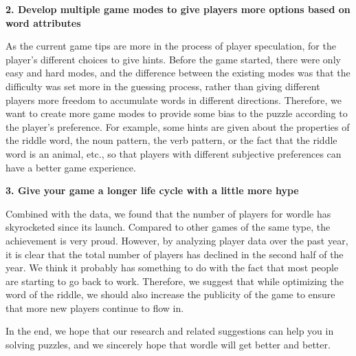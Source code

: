 \documentclass{mcmthesis}
\begin{document}
\begin{memo}[Memorandum]
 \textbf{2. Develop multiple game modes to give players more options based on word attributes}
 
 As the current game tips are more in the process of player speculation, for the player's different choices to give hints. Before the game started, there were only easy and hard modes, and the difference between the existing modes was that the difficulty was set more in the guessing process, rather than giving different players more freedom to accumulate words in different directions. Therefore, we want to create more game modes to provide some bias to the puzzle according to the player's preference. For example, some hints are given about the properties of the riddle word, the noun pattern, the verb pattern, or the fact that the riddle word is an animal, etc., so that players with different subjective preferences can have a better game experience.
 
\textbf{3. Give your game a longer life cycle with a little more hype}

Combined with the data, we found that the number of players for wordle has skyrocketed since its launch. Compared to other games of the same type, the achievement is very proud. However, by analyzing player data over the past year, it is clear that the total number of players has declined in the second half of the year. We think it probably has something to do with the fact that most people are starting to go back to work. Therefore, we suggest that while optimizing the word of the riddle, we should also increase the publicity of the game to ensure that more new players continue to flow in.

In the end, we hope that our research and related suggestions can help you in solving puzzles, and we sincerely hope that wordle will get better and better.

\vspace {3pt}
 \end{memo}
\end{document}
